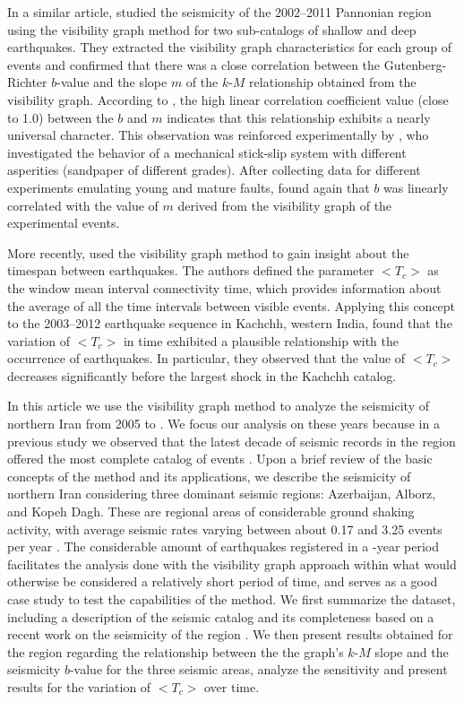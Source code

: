 In a similar article, \citet{Telesca2014} studied the seismicity of the 2002--2011 Pannonian region using the visibility graph method for two sub-catalogs of shallow and deep earthquakes. They extracted the visibility graph characteristics for each group of events and confirmed that there was a close correlation between the Gutenberg-Richter $b$-value and the slope $m$ of the $k$-$M$ relationship obtained from the visibility graph. According to \citet{Telesca2014}, the high linear correlation coefficient value (close to 1.0) between the $b$ and $m$ indicates that this relationship exhibits a nearly universal character. This observation was reinforced experimentally by \citet{Telesca2014-pone}, who investigated the behavior of a mechanical stick-slip system with different asperities (sandpaper of different grades). After collecting data for different experiments emulating young and mature faults, \citet{Telesca2014-pone} found again that $b$ was linearly correlated with the value of $m$ derived from the visibility graph of the experimental events.

More recently, \citet{Telesca2016} used the visibility graph method to gain insight about the timespan between earthquakes. The authors defined the parameter $<$$T_c$$>$ as the window mean interval connectivity time, which provides information about the average of all the time intervals between visible events. Applying this concept to the 2003--2012 earthquake sequence in Kachchh, western India, \citet{Telesca2016} found that the variation of $<$$T_c$$>$ in time exhibited a plausible relationship with the occurrence of earthquakes. In particular, they observed that the value of $<$$T_c$$>$ decreases significantly before the largest shock in the Kachchh catalog.

In this article we use the visibility graph method to analyze the seismicity of northern Iran from 2005 to . We focus our analysis on these years because in a previous study we observed that the latest decade of seismic records in the region offered the most complete catalog of events \citep[][]{Khoshnevis2017}. Upon a brief review of the basic concepts of the method and its applications, we describe the seismicity of northern Iran considering three dominant seismic regions: Azerbaijan, Alborz, and Kopeh Dagh. These are regional areas of considerable ground shaking activity, with average seismic rates varying between about 0.17 and 3.25 events per year \citep[e.g.,][]{Nemati2015}. The considerable amount of earthquakes registered in a -year period facilitates the analysis done with the visibility graph approach within what would otherwise be considered a relatively short period of time, and serves as a good case study to test the capabilities of the method. We first summarize the dataset, including a description of the seismic catalog and its completeness based on a recent work on the seismicity of the region \citep{Khoshnevis2017}. We then present results obtained for the region regarding the relationship between the the graph's $k$-$M$ slope and the seismicity $b$-value for the three seismic areas, analyze the sensitivity  and present results for the variation of $<$$T_c$$>$ over time.
